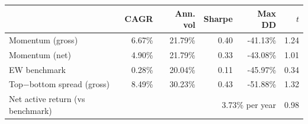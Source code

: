 \begin{tabular}{lrrrrr}
\toprule
 & CAGR & Ann. vol & Sharpe & Max DD & $t$ \\
\midrule
Momentum (gross) & 6.67\% & 21.79\% & 0.40 & -41.13\% & 1.24 \\
Momentum (net) & 4.90\% & 21.79\% & 0.33 & -43.08\% & 1.01 \\
EW benchmark & 0.28\% & 20.04\% & 0.11 & -45.97\% & 0.34 \\
Top$-$bottom spread (gross) & 8.49\% & 30.23\% & 0.43 & -51.88\% & 1.32 \\
\midrule
Net active return (vs benchmark) & \multicolumn{4}{r}{3.73\% per year} & 0.98 \\
\bottomrule
\end{tabular}
